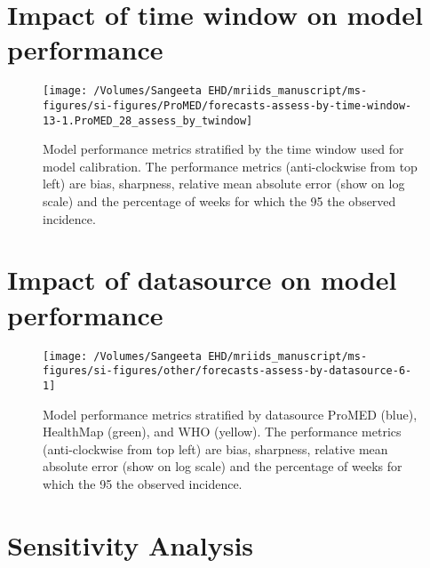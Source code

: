 \documentclass[11pt,]{article}
\begin{document}
\hypertarget{impact-of-time-window-on-model-performance}{%
  \section{Impact of time window on model
    performance}\label{impact-of-time-window-on-model-performance}}

\begin{figure}

  {\centering \texttt{[image: /Volumes/Sangeeta EHD/mriids\_manuscript/ms-figures/si-figures/ProMED/forecasts-assess-by-time-window-13-1.ProMED\_28\_assess\_by\_twindow]} 

  }

  \caption{Model performance metrics stratified by the time window used for
    model calibration. The performance metrics (anti-clockwise from top left) are
    bias, sharpness, relative mean absolute error (show on log scale) and
    the percentage of weeks for which the 95%
    the observed incidence.}
  \label{fig:perftw}
\end{figure}

\hypertarget{impact-of-datasource-on-model-performance}{%
  \section{Impact of datasource on model
    performance}\label{impact-of-datasource-on-model-performance}}

\begin{figure}

  {\centering \texttt{[image: /Volumes/Sangeeta EHD/mriids\_manuscript/ms-figures/si-figures/other/forecasts-assess-by-datasource-6-1]} 

  }

  \caption{Model performance metrics stratified by datasource
    ProMED (blue), HealthMap (green), and WHO (yellow).
    The performance metrics (anti-clockwise from top left) are
    bias, sharpness, relative mean absolute error (show on log scale) and
    the percentage of weeks for which the 95%
    the observed incidence.}\label{fig:perfds}
\end{figure}

\hypertarget{sensitivity-analysis}{%
  \section{Sensitivity Analysis}\label{sensitivity-analysis}}
\end{document}
